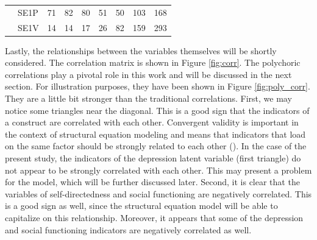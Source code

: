 \documentclass[11pt]{article}
\begin{document}
\begin{table}[h!]
{\begin{tabular}{|l|l|lllllll|}
                                    & SE1P                           & \multicolumn{1}{l|}{71}         & \multicolumn{1}{l|}{82}         & \multicolumn{1}{l|}{80}         & \multicolumn{1}{l|}{51}         & \multicolumn{1}{l|}{50}         & \multicolumn{1}{l|}{103}       & 168       \\ \cline{2-9} 
                                    & SE1V                           & \multicolumn{1}{l|}{14}         & \multicolumn{1}{l|}{14}         & \multicolumn{1}{l|}{17}         & \multicolumn{1}{l|}{26}         & \multicolumn{1}{l|}{82}         & \multicolumn{1}{l|}{159}       & 293       \\ \hline
\end{tabular}
}
\end{table}

Lastly, the relationships between the variables themselves will be shortly
considered. The correlation matrix is shown in Figure \ref{fig:corr}. The
polychoric correlations play a pivotal role in this work and will be discussed
in the next section. For illustration purposes, they have been shown in Figure
\ref{fig:poly_corr}. They are a little bit stronger than the traditional
correlations.
%
First, we may notice some triangles near the diagonal. This is a good sign that
the indicators of a construct are correlated with each other. Convergent
validity is important in the context of structural equation modeling and means
that indicators that load on the same factor should be strongly related to each
other (\cite{brown2015}). In the case of the present study, the indicators of
the depression latent variable (first triangle) do not appear to be strongly
correlated with each other. This may present a problem for the model, which will
be further discussed later. Second, it is clear that the variables of
self-directedness and social functioning are negatively correlated. This is a
good sign as well, since the structural equation model will be able to
capitalize on this relationship. Moreover, it appears that some of the
depression and social functioning indicators are negatively correlated as well.
\end{document}
